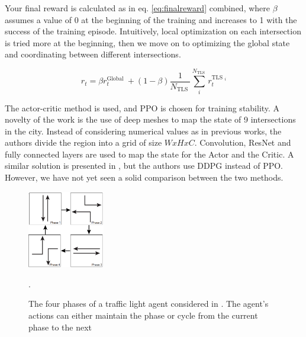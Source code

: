\documentclass[a4paper,twoside]{article}
\begin{document}
Your final reward is calculated as in eq. \ref{eq:finalreward} combined, where $\beta$ assumes a value of 0 at the beginning of the training and increases to 1 with the success of the training episode. Intuitively, local optimization on each intersection is tried more at the beginning, then we move on to optimizing the global state and coordinating between different intersections.

\begin{equation}	\label{eq:finalreward}
	r_{t}=\beta r_{t}^{\text {Global }}+(1-\beta) \frac{1}{N_{\text {TLS }}} \sum_{i}^{N_{\text {TLS }}} r_{t}^{\text {TLS }_{i}}
\end{equation}
		
The actor-critic method is used, and PPO \cite{schulman2017proximal} is chosen for training stability. A novelty of the work is the use of deep meshes to map the state of 9 intersections in the city. Instead of considering numerical values as in previous works, the authors divide the region into a grid of size $WxHxC$. Convolution, ResNet and fully connected layers are used to map the state for the Actor and the Critic. A similar solution is presented in \cite{Cas17}, but the authors use DDPG \cite{lillicrap2019continuous} instead of PPO. However, we have not yet seen a solid comparison between the two methods.
		
\begin{figure}[!h]
			\includegraphics[width=0.3\textwidth]{phases.png}
			\centering
			\caption{The four phases of a traffic light agent considered in \cite{LiDa}. The agent's actions can either maintain the phase or cycle from the current phase to the next}.
			\label{fig:phases}
\end{figure}
		
\end{document}
